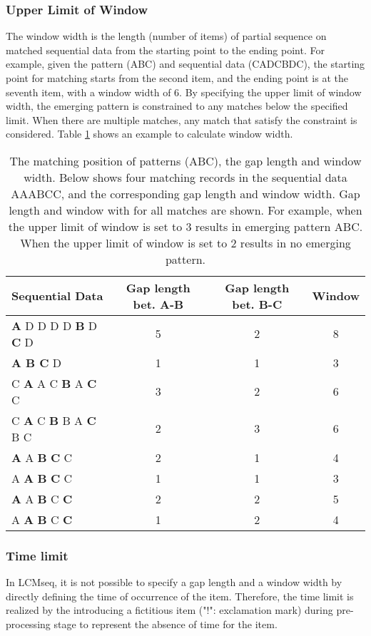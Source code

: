\subsubsection*{Upper Limit of Window}

The window width is the length  (number of items) of partial sequence on matched sequential data from the starting point to the ending point. For example, given the pattern (ABC) and sequential data (CADCBDC), the starting point for matching starts from the second item, and the ending point is at the seventh item, with a window width of 6. By specifying the upper limit of window width, the emerging  pattern is constrained to any matches below the specified limit. 
When there are multiple matches, any match that satisfy the constraint is considered.  Table \ref{tbl:gapwin} shows an example to calculate window width. 


\begin{table}[htbp]
\begin{center}
\caption{ 
The matching position of patterns (ABC), the gap length and window width. Below shows four matching records in the sequential data AAABCC, and the corresponding gap length and window width. Gap length and window with for all matches are shown. 
For example, when the upper limit of window is set to 3 results in emerging pattern ABC. When the upper limit of window is set to 2 results in no emerging pattern. \label{tbl:gapwin} }

\begin{tabular}{lccc}
\hline
Sequential Data & Gap length bet. A-B & Gap length bet. B-C & Window \\
\hline
{\bf A} D D D D {\bf B} D {\bf C} D & 5 & 2 & 8 \\
{\bf A B C} D & 1 & 1 & 3 \\
C {\bf A} A C {\bf B} A {\bf C} C & 3 & 2 & 6\\
C {\bf A} C {\bf B} B A {\bf C} B C & 2 & 3 & 6\\
\hline
{\bf A} A {\bf B} {\bf C} C & 2 & 1 & 4\\
A {\bf A} {\bf B} {\bf C} C & 1 & 1 & 3\\
{\bf A} A {\bf B} C {\bf C} & 2 & 2 & 5\\
A {\bf A} {\bf B} C {\bf C} & 1 & 2 & 4\\
\hline
\end{tabular} 
\end{center}
\end{table} 

\subsubsection*{Time limit}
In LCMseq, it is not possible to specify a gap length  and a window width by directly defining the time of occurrence of the item. Therefore, the time limit is realized by the introducing a fictitious item ("!": exclamation mark) during pre-processing stage to represent the absence of time for the item.

